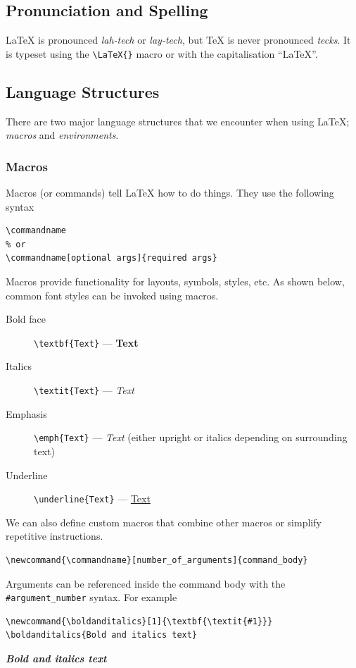 \documentclass[11pt, twoside]{article}
\begin{document}
\subsection{Pronunciation and Spelling}
\LaTeX{} is pronounced \emph{lah-tech} or \emph{lay-tech}, but \TeX{} is never pronounced \emph{tecks}. It is typeset using the \lstinline|\LaTeX{}| macro or with the capitalisation ``LaTeX''.
\subsection{Language Structures}
There are two major language structures that we encounter when using \LaTeX{}; \textit{macros} and \textit{environments}.
\subsubsection{Macros}
Macros (or commands) tell \LaTeX{} how to do things. They use the following syntax
\begin{lstlisting}
\commandname
% or
\commandname[optional args]{required args}
\end{lstlisting}
Macros provide functionality for layouts, symbols, styles, etc. As shown below, common font styles can be invoked using macros.
\begin{description}
    \item[Bold face] \lstinline|\textbf{Text}| --- \textbf{Text}
    \item[Italics] \lstinline|\textit{Text}| --- \textit{Text}
    \item[Emphasis] \lstinline|\emph{Text}| --- \emph{Text} (either upright or italics depending on surrounding text)
    \item[Underline] \lstinline|\underline{Text}| --- \underline{Text}
\end{description}
We can also define custom macros that combine other macros or simplify repetitive instructions.
\begin{lstlisting}
\newcommand{\commandname}[number_of_arguments]{command_body}
\end{lstlisting}
Arguments can be referenced inside the command body with the \lstinline|#argument_number| syntax.
For example
\begin{lstlisting}
\newcommand{\boldanditalics}[1]{\textbf{\textit{#1}}}
\boldanditalics{Bold and italics text}
\end{lstlisting}
\newcommand{\boldanditalics}[1]{\textbf{\textit{#1}}}
\boldanditalics{Bold and italics text}
\end{document}
